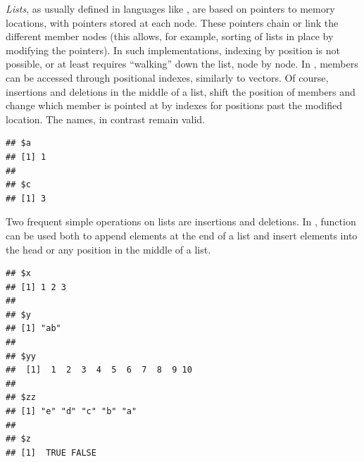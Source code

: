 \documentclass[krantz2]{krantz}\usepackage{knitr}
\begin{document}
\begin{explainbox}
\emph{Lists}, as usually defined in languages like \Clang, are based on pointers to memory locations, with pointers stored at each node. These pointers chain or link the different member nodes (this allows, for example, sorting of lists in place by modifying the pointers). In such implementations, indexing by position is not possible, or at least requires ``walking'' down the list, node by node. In \Rlang,  members can be accessed through positional indexes, similarly to vectors. Of course, insertions and deletions in the middle of a list, shift the position of members and change which member is pointed at by indexes for positions past the modified location. The names, in contrast remain valid.

\begin{knitrout}\footnotesize
{}\color{fgcolor}\begin{kframe}
\begin{alltt}
\hlstd{(} \hlstd{=} \hlstd{,}  \hlstd{=} \hlstd{,}  \hlstd{=} \hlstd{)[}\hlopt{-}\hlstd{]}
\end{alltt}
\begin{verbatim}
## $a
## [1] 1
## 
## $c
## [1] 3
\end{verbatim}
\end{kframe}
\end{knitrout}
\end{explainbox}

Two frequent simple operations on lists are insertions and deletions. In \Rlang, function  can be used both to append elements at the end of a list and insert elements into the head or any position in the middle of a list.

\begin{knitrout}\footnotesize
{}\color{fgcolor}\begin{kframe}
\begin{alltt}
 \hlkwb{<-}  \hlstd{(} \hlstd{=} \hlopt{:}\hlstd{,}  \hlstd{= letters[}\hlopt{:}\hlstd{]),} \hlstd{)}
\end{alltt}
\begin{verbatim}
## $x
## [1] 1 2 3
## 
## $y
## [1] "ab"
## 
## $yy
##  [1]  1  2  3  4  5  6  7  8  9 10
## 
## $zz
## [1] "e" "d" "c" "b" "a"
## 
## $z
## [1]  TRUE FALSE
\end{verbatim}
\end{kframe}
\end{knitrout}
\end{document}
